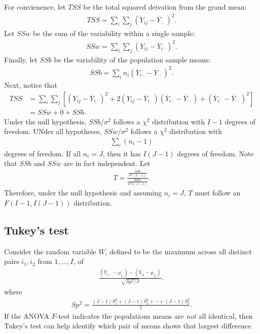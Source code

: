 For convienence, let $TSS$ be the total squared deivation from the grand mean:
\begin{align*}
    TSS = \sum_{i}\sum_{j}\left(Y_{ij} - \overline{Y}_{\cdot\cdot}\right)^2.
\end{align*}
Let $SSw$ be the sum of the variability within a single sample:
\begin{align*}
    SSw = \sum_{i}\sum_{j}\left(Y_{ij} - \overline{Y}_{i\cdot}\right)^2.
\end{align*}
Finally, let $SSb$ be the variability of the population sample means:
\begin{align*}
    SSb = \sum_{i}n_{i}\left(\overline{Y}_{i\cdot} - \overline{Y}_{\cdot\cdot}\right)^2.
\end{align*}
Next, notice that
\begin{align*}
    TSS &= \sum_{i}\sum_{j}\left[\left(Y_{ij} - \overline{Y}_{i\cdot}\right)^2  + 2\left(Y_{ij} - \overline{Y}_{i\cdot}\right)\left(\overline{Y}_{i\cdot} - \overline{Y}_{\cdot\cdot}\right) + \left(\overline{Y}_{i\cdot} - \overline{Y}_{\cdot\cdot}\right)^2\right] \\
    &= SSw + 0 + SSb.
\end{align*}
Under the null hypothesis, $SSb/\sigma^2$ follows a $\chi^2$ distribution with $I - 1$ degrees of freedom. UNder all hypotheses, $SSw/\sigma^2$ follows a $\chi^2$ distribution with
\begin{align*}
    \sum_{i}(n_i - 1)
\end{align*}
degrees of freedom. If all $n_i = J$, then it has $I(J - 1)$ degrees of freedom. Note that $SSb$ and $SSw$ are in fact independent. Let
\begin{align*}
    T = \frac{\frac{SSb}{\sigma^2(I-1)}}{\frac{SSw}{\sigma^2I(J-1)}}.
\end{align*}
Therefore, under the null hypothesis and assuming $n_i = J$, $T$ must follow an $F(I-1, I(J-1))$ distribution.

\subsection{Tukey's test}

Consider the random variable $W$, defined to be the maximum across all distinct pairs $i_1, i_2$ from $1, \ldots, I$, of
\begin{align*}
    \frac{\left(\overline{Y}_{i_1\cdot} - \mu_{i_1}\right) - \left(\overline{Y_{i_2}} - \mu_{i_2}\right)}{\sqrt{Sp^2/J}},
\end{align*}
where
\begin{align*}
    Sp^2 = \frac{(J-1)S_1^2 + (J-1)S_2^2 + \cdots + (J-1)S_I^2}{1}.
\end{align*}
If the ANOVA $F$-test indicates the populations means are \emph{not} all identical, then Tukey's test can help identify which pair of means shows that largest difference.
